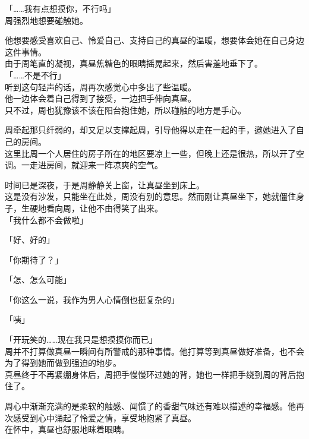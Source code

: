 「……我有点想摸你，不行吗」\\

周强烈地想要碰触她。

他想要感受喜欢自己、怜爱自己、支持自己的真昼的温暖，想要体会她在自己身边这件事情。\\

由于周笔直的凝视，真昼焦糖色的眼睛摇晃起来，然后害羞地垂下了。\\

「……不是不行」\\

听到这句轻声的话，周再次感觉心中多出了些温暖。\\

他一边体会着自己得到了接受，一边把手伸向真昼。\\

只不过，周也犹豫该不该在阳台抱住她，所以碰触的地方是手心。

周牵起那只纤弱的，却又足以支撑起周，引导他得以走在一起的手，邀她进入了自己的房间。\\

这里比周一个人居住的房子所在的地区要凉上一些，但晚上还是很热，所以开了空调。一走进房间，就迎来一阵凉爽的空气。

时间已是深夜，于是周静静关上窗，让真昼坐到床上。\\

这是没有沙发，只能坐在此处，周没有别的意思。然而刚让真昼坐下，她就僵住身子，生硬地看向周，让他不由得笑了出来。\\

「我什么都不会做啦」

「好、好的」

「你期待了？」

「怎、怎么可能」

「你这么一说，我作为男人心情倒也挺复杂的」

「咦」

「开玩笑的……现在我只是想摸摸你而已」\\

周并不打算做真昼一瞬间有所警戒的那种事情。他打算等到真昼做好准备，也不会为了得到她而做到强迫的地步。\\

真昼终于不再紧绷身体后，周把手慢慢环过她的背，她也一样把手绕到周的背后抱住了。

周心中渐渐充满的是柔软的触感、闻惯了的香甜气味还有难以描述的幸福感。他再次感受到心中涌起了怜爱之情，享受地抱紧了真昼。\\

在怀中，真昼也舒服地眯着眼睛。

